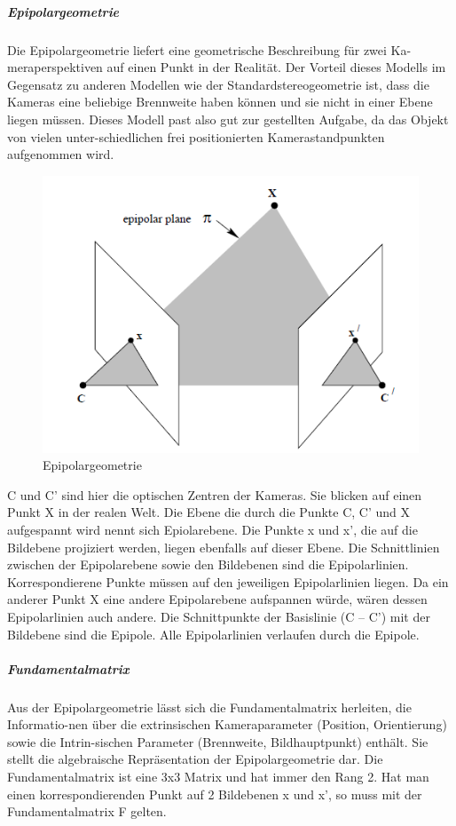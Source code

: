 \subparagraph{Epipolargeometrie}
Die Epipolargeometrie liefert eine geometrische Beschreibung für zwei Ka-meraperspektiven auf einen Punkt in der Realität. Der Vorteil dieses Modells im Gegensatz zu anderen Modellen wie der Standardstereogeometrie ist, dass die Kameras eine beliebige Brennweite haben können und sie nicht in einer Ebene liegen müssen. Dieses Modell past also gut zur gestellten Aufgabe, da das Objekt von vielen unter-schiedlichen frei positionierten Kamerastandpunkten aufgenommen wird.
\begin{figure}[ht]
    \centering
    \includegraphics[scale=0.75]{Figures/Epipolargeomtrie.PNG}
    \caption{Epipolargeometrie}
\end{figure}
C und C’ sind hier die optischen Zentren der Kameras. Sie blicken auf einen Punkt X in der realen Welt. Die Ebene die durch die Punkte C, C’ und X aufgespannt wird nennt sich Epiolarebene. Die Punkte x und x’, die auf die Bildebene projiziert werden, liegen ebenfalls auf dieser Ebene. Die Schnittlinien zwischen der Epipolarebene sowie den Bildebenen sind die Epipolarlinien. Korrespondierene Punkte müssen auf den jeweiligen Epipolarlinien liegen. Da ein anderer Punkt X eine andere Epipolarebene aufspannen würde, wären dessen Epipolarlinien auch andere. Die Schnittpunkte der Basislinie (C – C’) mit der Bildebene sind die Epipole. Alle Epipolarlinien verlaufen durch die Epipole.

\subparagraph{Fundamentalmatrix}
Aus der Epipolargeometrie lässt sich die Fundamentalmatrix herleiten, die Informatio-nen über die extrinsischen Kameraparameter (Position, Orientierung) sowie die Intrin-sischen Parameter (Brennweite, Bildhauptpunkt) enthält. Sie stellt die algebraische Repräsentation der Epipolargeometrie dar. Die Fundamentalmatrix ist eine 3x3 Matrix und hat immer den Rang 2. Hat man einen korrespondierenden Punkt auf 2 Bildebenen x und x’, so muss mit der Fundamentalmatrix F gelten.
\\

